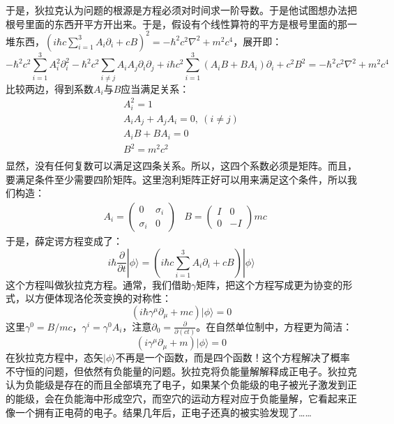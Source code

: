 \documentclass{ctexart}
\begin{document}
于是，狄拉克认为问题的根源是方程必须对时间求一阶导数。于是他试图想办法把根号里面的东西开平方开出来。于是，假设有个线性算符的平方是根号里面的那一堆东西，$(i\hbar c\sum_{i=1}^3A_i\partial_i+cB)^2=-\hbar^2c^2\nabla^2+m^2c^4$，展开即：
\begin{equation}
-\hbar^2c^2\sum_{i=1}^3A_i^2\partial_i^2-\hbar^2c^2\sum_{i\neq j}A_iA_j\partial_i\partial_j+i\hbar c^2\sum_{i=1}^3(A_iB+BA_i)\partial_i+c^2B^2=-\hbar^2c^2\nabla^2+m^2c^4 
\end{equation}
比较两边，得到系数$A_i$与$B$应当满足关系：
\begin{gather}
A_i^2=1 \\
A_iA_j+A_jA_i=0,\ (i\neq j) \\
A_iB+BA_i=0 \\
B^2=m^2c^2 \\
\end{gather}
显然，没有任何复数可以满足这四条关系。所以，这四个系数必须是矩阵。而且，要满足条件至少需要四阶矩阵。这里泡利矩阵正好可以用来满足这个条件，所以我们构造：
\begin{align}
&A_i=\begin{pmatrix}
0 & \sigma_i\\
\sigma_i & 0
\end{pmatrix}&B=\begin{pmatrix}
I & 0\\
0 & -I
\end{pmatrix}mc
\end{align}
于是，薛定谔方程变成了：
\begin{equation}
i\hbar\frac{\partial}{\partial t}|\phi\rangle=(i\hbar c\sum_{i=1}^3A_i\partial_i+cB)|\phi\rangle
\end{equation}
这个方程叫做狄拉克方程。通常，我们借助$\gamma$矩阵，把这个方程写成更为协变的形式，以方便体现洛伦茨变换的对称性：
\begin{equation}
(i\hbar\gamma^\mu\partial_\mu+mc)|\phi\rangle=0
\end{equation}
这里$\gamma^0=B/mc$，$\gamma^i=\gamma^0A_i$，注意$\partial_0=\frac{\partial}{\partial(ct)}$。在自然单位制中，方程更为简洁：
\begin{equation}
(i\gamma^\mu\partial_\mu+m)|\phi\rangle=0
\end{equation}
在狄拉克方程中，态矢$|\phi\rangle$不再是一个函数，而是四个函数！这个方程解决了概率不守恒的问题，但依然有负能量的问题。狄拉克将负能量解解释成正电子。狄拉克认为负能级是存在的而且全部填充了电子，如果某个负能级的电子被光子激发到正的能级，会在负能海中形成空穴，而空穴的运动方程对应于负能量解，它看起来正像一个拥有正电荷的电子。结果几年后，正电子还真的被实验发现了……
\end{document}
